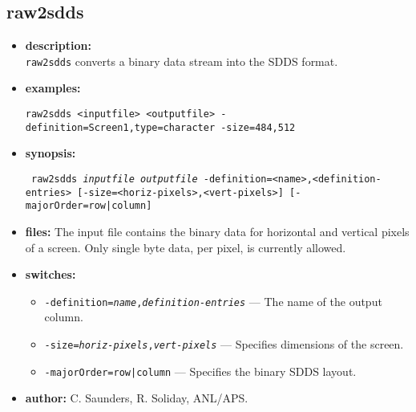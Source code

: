 \newpage 
\subsection{raw2sdds} 
\label{raw2sdds} 
 
\begin{itemize} 
\item {\bf description:} \hspace*{1mm}\\ 
{\tt raw2sdds} converts a binary data stream into the SDDS format.
\item {\bf examples:} 
\begin{flushleft}
{\tt raw2sdds <inputfile> <outputfile> -definition=Screen1,type=character -size=484,512}
\end{flushleft} 
\item {\bf synopsis:}  
\begin{flushleft}
{\tt 
raw2sdds {\em inputfile} {\em outputfile} 
 -definition=<name>,<definition-entries> 
 [-size=<horiz-pixels>,<vert-pixels>] 
 [-majorOrder=row|column]}
\end{flushleft} 
\item {\bf files:} 
The input file contains the binary data for horizontal and vertical pixels of a screen. Only single byte data, per pixel, is currently allowed.
\item {\bf switches:} 
    \begin{itemize} 
    \item {\tt -definition={\em name},{\em definition-entries}} --- The name of the output column. 
    \item {\tt -size={\em horiz-pixels},{\em vert-pixels}} --- Specifies dimensions of the screen.
    \item {\tt -majorOrder=row|column} --- Specifies the binary SDDS layout.
\end{itemize} 

\item {\bf author:} C. Saunders, R. Soliday, ANL/APS. 
\end{itemize} 
 

